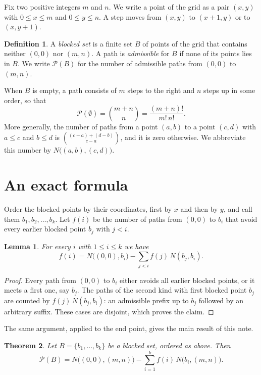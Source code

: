 \documentclass[11pt]{article}
\newtheorem{theorem}{Theorem}
\newtheorem{lemma}[theorem]{Lemma}
\theoremstyle{definition}
\newtheorem{definition}{Definition}
\newcommand{\paths}{\mathcal{P}}
\begin{document}
Fix two positive integers $m$ and $n$. We write a point of the grid as a pair $(x,y)$ with $0 \le x \le m$ and $0 \le y \le n$. A step moves from $(x,y)$ to $(x+1,y)$ or to $(x,y+1)$.

\begin{definition}
A \emph{blocked set} is a finite set $B$ of points of the grid that contains neither $(0,0)$ nor $(m,n)$. A path is \emph{admissible} for $B$ if none of its points lies in $B$. We write $\paths(B)$ for the number of admissible paths from $(0,0)$ to $(m,n)$.
\end{definition}

When $B$ is empty, a path consists of $m$ steps to the right and $n$ steps up in some order, so that
\begin{equation}
  \paths(\emptyset) = \binom{m+n}{n} = \frac{(m+n)!}{m!\,n!}.
  \label{eq:free}
\end{equation}
More generally, the number of paths from a point $(a,b)$ to a point $(c,d)$ with $a \le c$ and $b \le d$ is $\binom{(c-a)+(d-b)}{c-a}$, and it is zero otherwise. We abbreviate this number by $N\big((a,b),(c,d)\big)$.

\section{An exact formula}
\label{sec:formula}

Order the blocked points by their coordinates, first by $x$ and then by $y$, and call them $b_1, b_2, \dots, b_k$. Let $f(i)$ be the number of paths from $(0,0)$ to $b_i$ that avoid every earlier blocked point $b_j$ with $j < i$.

\begin{lemma}
\label{lem:first}
For every $i$ with $1 \le i \le k$ we have
\[
  f(i) = N\big((0,0),b_i\big) - \sum_{j<i} f(j)\, N(b_j,b_i).
\]
\end{lemma}

\begin{proof}
Every path from $(0,0)$ to $b_i$ either avoids all earlier blocked points, or it meets a first one, say $b_j$. The paths of the second kind with first blocked point $b_j$ are counted by $f(j)\,N(b_j,b_i)$: an admissible prefix up to $b_j$ followed by an arbitrary suffix. These cases are disjoint, which proves the claim.
\end{proof}

The same argument, applied to the end point, gives the main result of this note.

\begin{theorem}
\label{thm:count}
Let $B = \{b_1,\dots,b_k\}$ be a blocked set, ordered as above. Then
\begin{equation}
  \paths(B) = N\big((0,0),(m,n)\big) - \sum_{i=1}^{k} f(i)\, N\big(b_i,(m,n)\big).
  \label{eq:main}
\end{equation}
\end{theorem}
\end{document}
